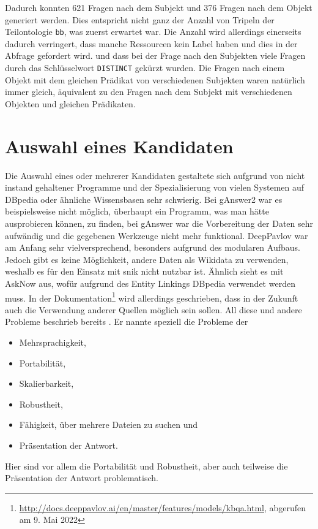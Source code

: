 Dadurch konnten 621 Fragen nach dem Subjekt und 376 Fragen nach dem Objekt generiert werden.
Dies entspricht nicht ganz der Anzahl von Tripeln der Teilontologie \texttt{bb}, was zuerst erwartet war.
Die Anzahl wird allerdings einerseits dadurch verringert, dass manche Ressourcen kein Label haben und dies in der Abfrage gefordert wird.
und dass bei der Frage nach den Subjekten viele Fragen durch das Schlüsselwort \texttt{DISTINCT} gekürzt wurden.
Die Fragen nach einem Objekt mit dem gleichen Prädikat von verschiedenen Subjekten waren natürlich immer gleich,
äquivalent zu den Fragen nach dem Subjekt mit verschiedenen Objekten und gleichen Prädikaten.

\section{Auswahl eines Kandidaten}

Die Auswahl eines oder mehrerer Kandidaten gestaltete sich aufgrund von nicht instand gehaltener Programme
und der Spezialisierung von vielen Systemen auf DBpedia oder ähnliche Wissensbasen sehr schwierig.
Bei gAnswer2 war es beispielsweise nicht möglich, überhaupt ein Programm, was man hätte ausprobieren können, zu finden,
bei gAnswer war die Vorbereitung der Daten sehr aufwändig und die gegebenen Werkzeuge nicht mehr funktional.
DeepPavlov war am Anfang sehr vielversprechend, besonders aufgrund des modularen Aufbaus.
Jedoch gibt es keine Möglichkeit, andere Daten als Wikidata zu verwenden, weshalb es für den Einsatz mit \ac{snik} nicht nutzbar ist.
Ähnlich sieht es mit AskNow aus, wofür aufgrund des Entity Linkings DBpedia verwendet werden muss.
In der Dokumentation\footnote{\url{http://docs.deeppavlov.ai/en/master/features/models/kbqa.html}, abgerufen am 9. Mai 2022} wird allerdings geschrieben,
dass in der Zukunft auch die Verwendung anderer Quellen möglich sein sollen.
All diese und andere Probleme beschrieb bereits \citet{diefenbachkbqa}.
Er nannte speziell die Probleme der
\begin{itemize}
  \item Mehrsprachigkeit,
  \item Portabilität,
  \item Skalierbarkeit,
  \item Robustheit,
  \item Fähigkeit, über mehrere Dateien zu suchen und
  \item Präsentation der Antwort.
\end{itemize}
Hier sind vor allem die Portabilität und Robustheit, aber auch teilweise die Präsentation der Antwort problematisch.


